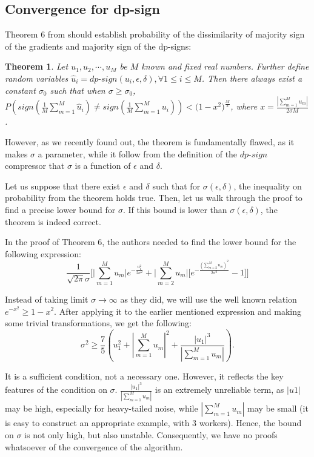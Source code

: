 \documentclass[12pt]{article}
\newtheorem{theorem}{Theorem}
\begin{document}
\subsection{Convergence for dp-sign}
Theorem 6 from \cite{Jin2020} should establish probability of the dissimilarity of majority sign of the gradients and majority sign of the dp-signs:   
\begin{theorem}\label{dp-sign-probabilities}
    Let $u_{1},u_{2},\cdots,u_{M}$ be $M$ known and fixed real numbers. Further define random variables $\hat{u}_{i}=dp\text{-}sign(u_{i},\epsilon,\delta), \forall 1\leq i \leq M$. Then there always exist a constant $\sigma_{0}$ such that when $\sigma \geq \sigma_{0}$, $P(sign(\frac{1}{M}\sum_{m=1}^{M}\hat{u}_{i})\neq sign(\frac{1}{M}\sum_{m=1}^{M}u_{i})) <\big(1-x^2\big)^{\frac{M}{2}}$,
    where $x = \frac{|\sum_{m=1}^{M}u_{m}|}{2\sigma M}$.
\end{theorem}
However, as we recently found out, the theorem is fundamentally flawed, as it makes $\sigma$ a parameter, while it follow from the definition of the $dp\text{-}sign$ compressor that $\sigma$ is a function of $\epsilon$ and $\delta$. 

Let us suppose that there exist $\epsilon$ and $\delta$ such that for $\sigma(\epsilon, \delta)$, the inequality on probability from the theorem holds true. Then, let us walk through the proof to find a precise lower bound for $\sigma$. If this bound is lower than $\sigma(\epsilon, \delta)$, the theorem is indeed correct.

In the proof of Theorem 6, the authors needed to find the lower bound for the following expression:
$$\frac{1}{\sqrt{2\pi}\sigma}\bigg[\bigg|\sum_{m=1}^{M}u_{m}\bigg|e^{-\frac{u_{1}^2}{2\sigma^2}}+\bigg|\sum_{m=2}^{M}u_{m}\bigg|\bigg[e^{-\frac{(\sum_{m=2}^{M}u_{m})^2}{2\sigma^2}}-1\bigg]\bigg]$$

Instead of taking limit $\sigma \to \infty$ as they did, we will use the well known relation $e^{-x^2} \geq 1 - x^2$. After applying it to the earlier mentioned expression and making some trivial transformations, we get the following:
$$\sigma^2 \geq
\frac{7}{5} \left(u_1^2 + \left|\sum_{m=1}^M u_m\right|^2 + \frac{|u_1|^3}{\left|\sum_{m=1}^M u_m\right|}\right).
$$

It is a sufficient condition, not a necessary one. However, it reflects the key features of the condition on $\sigma$. $\frac{|u_1|^3}{\left|\sum_{m=1}^M u_m\right|}$ is an extremely unreliable term, as $|u1|$ may be high, especially for heavy-tailed noise, while $\left|\sum_{m=1}^M u_m\right|$ may be small (it is easy to construct an appropriate example, with 3 workers). Hence, the bound on $\sigma$ is not only high, but also unstable. Consequently, we have no proofs whatsoever of the convergence of the algorithm.
\end{document}

